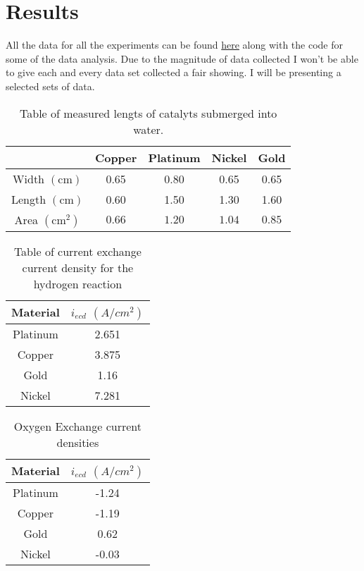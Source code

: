 \documentclass[twocolumn]{revtex4-2}
\begin{document}
\section{Results}
All the data for all the experiments can be found \href{
https://www.github.com/SixtenNordegren/Water_Electrolysis}{here} along with the code 
for some of the data analysis. Due to the magnitude of data collected I won't be able to
give each and every data set collected a fair showing. I will be presenting a selected 
sets of data.


\begin{table}[h]
\begin{tabular}{|c|c|c|c|c|}
	\hline
	& Copper & Platinum & Nickel & Gold \\
	\hline
	Width $(\text{cm})$&0.65 &0.80&0.65&0.65\\
	\hline
	Length $(\text{cm})$ &0.60&1.50&1.30&1.60\\
	\hline
	Area $(\text{cm}^2)$ &$0.66$&$1.20$&$1.04$&$0.85$\\
	\hline
\end{tabular}
	\caption{Table of measured lengts of catalyts submerged into water.\label{table: area}}
\end{table}

\begin{table}[t]
\begin{tabular}{c | c}
Material & $i_{ecd}$ $(A/cm^2)$ \\
\hline
\hline
Platinum & 2.651 \\ 

Copper & 3.875 \\ 

Gold & 1.16 \\ 

Nickel & 7.281 \\ 
\end{tabular}
	\caption{Table of current exchange current density for the hydrogen reaction\label{table: ecd_H}}
\end{table}

\begin{table}[t]
	\begin{tabular}{c|c}
		Material & $i_{ecd}$ $(A/cm^2)$ \\
		\hline
		\hline
		Platinum& -1.24\\
						 
		Copper& -1.19\\

		Gold& 0.62\\
					    
		Nickel& -0.03\\
	\end{tabular}
	\caption{Oxygen Exchange current densities\label{table: ecd_O}}
\end{table}
\end{document}
